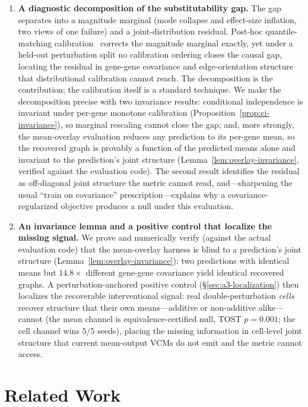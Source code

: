 \documentclass{article}
\theoremstyle{plain}
\theoremstyle{definition}
\theoremstyle{remark}
\begin{document}
\begin{enumerate}
\item \textbf{A diagnostic decomposition of the substitutability gap.} The gap separates into a magnitude marginal (mode collapse and effect-size inflation, two views of one failure) and a joint-distribution residual. Post-hoc quantile-matching calibration~\citep{bolstad2003,reinhard2001} corrects the magnitude marginal exactly, yet under a held-out perturbation split no calibration ordering closes the causal gap, locating the residual in gene-gene covariance and edge-orientation structure that distributional calibration cannot reach. The decomposition is the contribution; the calibration itself is a standard technique. We make the decomposition precise with two invariance results: conditional independence is invariant under per-gene monotone calibration (Proposition~\ref{prop:ci-invariance}), so marginal rescaling cannot close the gap; and, more strongly, the mean-overlay evaluation reduces any prediction to its per-gene mean, so the recovered graph is provably a function of the predicted means alone and invariant to the prediction's joint structure (Lemma~\ref{lem:overlay-invariance}, verified against the evaluation code). The second result identifies the residual as off-diagonal joint structure the metric cannot read, and---sharpening the usual ``train on covariance'' prescription---explains why a covariance-regularized objective produces a null under this evaluation.

\item \textbf{An invariance lemma and a positive control that localize the missing signal.} We prove and numerically verify (against the actual evaluation code) that the mean-overlay harness is blind to a prediction's joint structure (Lemma~\ref{lem:overlay-invariance}): two predictions with identical means but $14.8\times$ different gene-gene covariance yield identical recovered graphs. A perturbation-anchored positive control (\S\ref{sec:a3-localization}) then localizes the recoverable interventional signal: real double-perturbation \emph{cells} recover structure that their own means---additive or non-additive alike---cannot (the mean channel is equivalence-certified null, TOST $p{=}0.001$; the cell channel wins $5/5$ seeds), placing the missing information in cell-level joint structure that current mean-output VCMs do not emit and the metric cannot access.
\end{enumerate}

\section{Related Work}
\label{sec:related}
\end{document}
